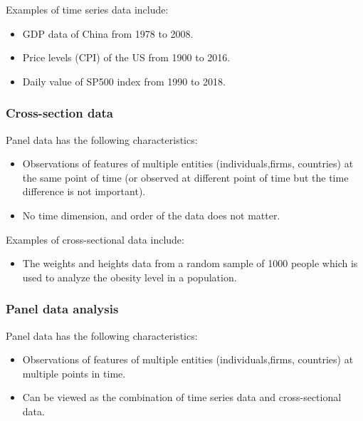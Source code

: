 \begin{refsection}
\begin{example}
Examples of time series data include:
\begin{itemize}
	\item GDP data of China from 1978 to 2008.
	\item Price levels (CPI) of the US from 1900 to 2016.
	\item Daily value of SP500  index from 1990 to 2018.  
\end{itemize}
\end{example}


\subsubsection{Cross-section data}


\begin{definition}
	Panel data has the following characteristics:
	\begin{itemize}
		\item Observations of features of multiple entities (individuals,firms, countries) at the same point of time (or observed at different point of time but the time difference is not important).
		\item No time dimension, and order of the data does not matter.
	\end{itemize}	
\end{definition}

\begin{example}
	Examples of cross-sectional data include:
	\begin{itemize}
		\item The weights and heights data from a random sample of 1000 people which is used to analyze the obesity level in a population. 
	\end{itemize}
\end{example}



\subsubsection{Panel data analysis}

\begin{definition}
Panel data has the following characteristics:
\begin{itemize}
	\item Observations of features of multiple entities (individuals,firms, countries) at multiple points in time.
	\item Can be viewed as the combination of time series data and cross-sectional data.
\end{itemize}	
\end{definition}


\end{refsection}
